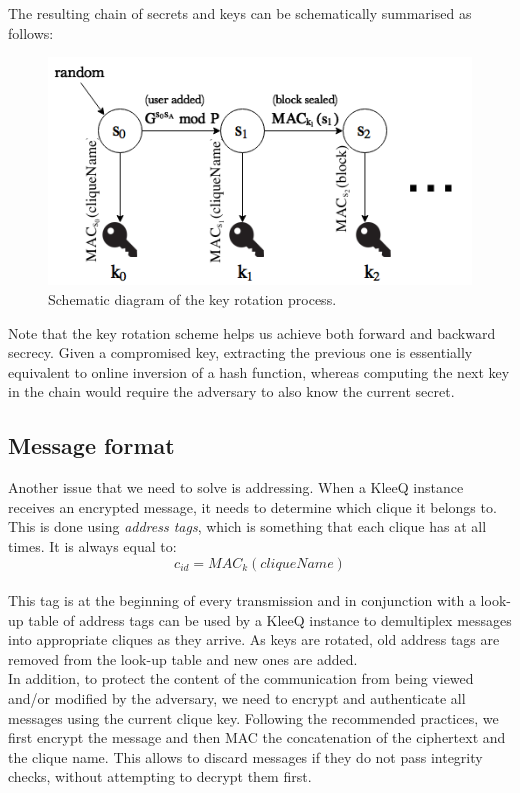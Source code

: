 \documentclass[a4paper, 12pt]{report}
\begin{document}
The resulting chain of secrets and keys can be schematically summarised as follows:
\begin{figure}[H]
    \centering
    \includegraphics[width = 0.8 \linewidth]{pics/keys_secrets.png}
    \caption{\label{fig:keys_secrets}Schematic diagram of the key rotation process.}
\end{figure}

Note that the key rotation scheme helps us achieve both forward and backward secrecy. Given a compromised key, extracting the previous one is essentially equivalent to online inversion of a hash function, whereas computing the next key in the chain would require the adversary to also know the current secret.


\subsection{Message format}
\label{ssec:prep.proto.msg_fmt}
Another issue that we need to solve is addressing. When a KleeQ instance receives an encrypted message, it needs to determine which clique it belongs to. This is done using \emph{address tags}, which is something that each clique has at all times. It is always equal to:
\begin{equation*}
    c_{id} = MAC_{k}(cliqueName)
\end{equation*} \\
This tag is at the beginning of every transmission and in conjunction with a look-up table of address tags can be used by a KleeQ instance to demultiplex messages into appropriate cliques as they arrive. As keys are rotated, old address tags are removed from the look-up table and new ones are added.\\

In addition, to protect the content of the communication from being viewed and/or modified by the adversary, we need to encrypt and authenticate all messages using the current clique key. Following the recommended practices, we first encrypt the message and then MAC the concatenation of the ciphertext and the clique name. This allows to discard messages if they do not pass integrity checks, without attempting to decrypt them first.
\end{document}
